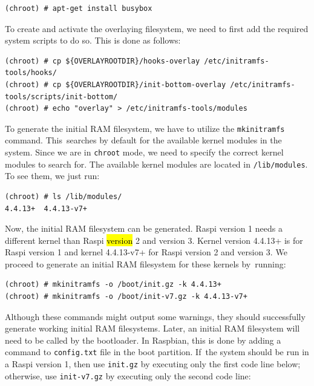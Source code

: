 \documentclass[electronics,article,accept,moreauthors,pdftex,10pt,a4paper]{mdpi}
\theoremstyle{mdpi}
\newcounter{ex}
\newcounter{re}
\theoremstyle{mdpidefinition}
\begin{document}
\begin{lstlisting}[]
(chroot) # apt-get install busybox
\end{lstlisting}
\FloatBarrier
\vspace{-5mm}

To create and activate the overlaying filesystem, we need to first
add the required system scripts to do so. This is done as follows:

\begin{lstlisting}[]
(chroot) # cp ${OVERLAYROOTDIR}/hooks-overlay /etc/initramfs-tools/hooks/
(chroot) # cp ${OVERLAYROOTDIR}/init-bottom-overlay /etc/initramfs-tools/scripts/init-bottom/
(chroot) # echo "overlay" > /etc/initramfs-tools/modules
\end{lstlisting}
\FloatBarrier
\vspace{-5mm}

To generate the initial RAM filesystem, we have to utilize the
\texttt{mkinitramfs} command. This~searches by default for the available
kernel modules in the system. Since we are in \texttt{chroot} mode, we need
to specify the correct kernel modules to search for. The available
kernel modules are located in \texttt{/lib/modules}.
To see them, we just run:

\begin{lstlisting}[]
(chroot) # ls /lib/modules/
4.4.13+  4.4.13-v7+
\end{lstlisting}
\FloatBarrier
\vspace{-5mm}

Now, the initial RAM filesystem can be generated. Raspi version 1
needs a different kernel than Raspi \hl{version} 2 and version 3. Kernel
version 4.4.13+ is for Raspi version 1 and kernel 4.4.13-v7+ for
Raspi version 2 and version 3. We proceed to generate an initial
RAM filesystem for these kernels by~running:
\begin{lstlisting}[]
(chroot) # mkinitramfs -o /boot/init.gz -k 4.4.13+
(chroot) # mkinitramfs -o /boot/init-v7.gz -k 4.4.13-v7+
\end{lstlisting}
\FloatBarrier
\vspace{-5mm}

Although these commands might output some warnings, they should
successfully generate working initial RAM filesystems. Later, an
initial RAM filesystem will need to be called by the bootloader.
In Raspbian, this is done by adding a command to \texttt{config.txt} file
in the boot partition. If~the system should be run in a Raspi version 1,
then use \texttt{init.gz} by executing only the first code line below;
otherwise, use \texttt{init-v7.gz} by executing only the second code line:
\end{document}
